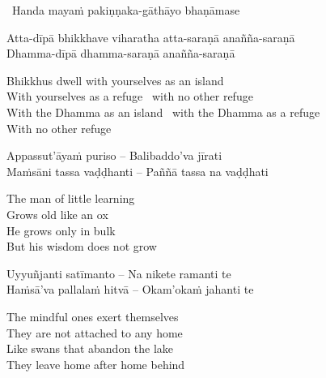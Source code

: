 \begin{leader}
  \anglebracketleft\ \hspace{-0.5mm}Handa mayaṁ pakiṇṇaka-gāthāyo bhaṇāmase \hspace{-0.5mm}\anglebracketright\
\end{leader}

\begin{verses}
  Atta-dīpā bhikkhave viharatha atta-saraṇā anañña-saraṇā\\
  Dhamma-dīpā dhamma-saraṇā anañña-saraṇā
\end{verses}

\begin{english-verses}
  Bhikkhus dwell with yourselves as an island\\
  With yourselves as a refuge \breathmark\ with no other refuge\\
  With the Dhamma as an island \breathmark\ with the Dhamma as a refuge\\
  With no other refuge
\end{english-verses}

\suttaRef{[SN 22.43]}

\begin{verses}
  Appassut'āyaṁ puriso – Balibaddo'va jīrati\\
  Maṁsāni tassa vaḍḍhanti – Paññā tassa na vaḍḍhati
\end{verses}

\begin{english-verses}
  The man of little learning\\
  Grows old like an ox\\
  He grows only in bulk\\
  But his wisdom does not grow
\end{english-verses}

\suttaRef{[Dhp 152]}

\begin{verses}
  Uyyuñjanti satīmanto – Na nikete ramanti te\\
  Haṁsā'va pallalaṁ hitvā – Okam'okaṁ jahanti te
\end{verses}

\begin{english-verses}
  The mindful ones exert themselves\\
  They are not attached to any home\\
  Like swans that abandon the lake\\
  They leave home after home behind
\end{english-verses}

